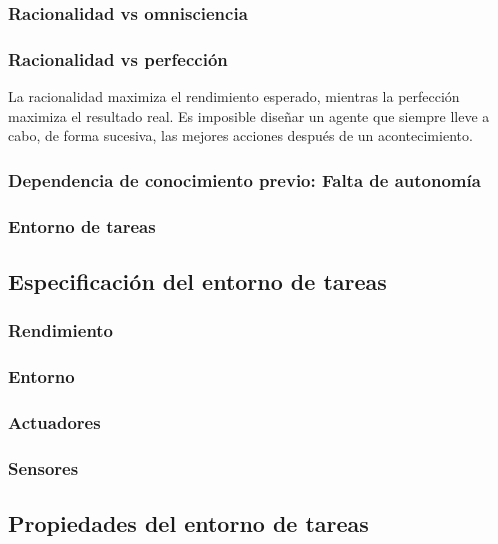 \documentclass[12pt,a4paper]{report}
\begin{document}
\subsubsection*{Racionalidad vs omnisciencia}
\subsubsection*{Racionalidad vs perfección}
La racionalidad maximiza el rendimiento esperado, mientras la perfección maximiza el resultado real. Es imposible diseñar un agente que siempre lleve a cabo, de forma sucesiva, las mejores acciones después de un acontecimiento.
\subsubsection*{Dependencia de conocimiento previo: Falta de autonomía}
\subsubsection*{Entorno de tareas}
\subsection*{Especificación del entorno de tareas}
\subsubsection*{Rendimiento}
\subsubsection*{Entorno}
\subsubsection*{Actuadores}
\subsubsection*{Sensores}
\subsection*{Propiedades del entorno de tareas}
\end{document}
